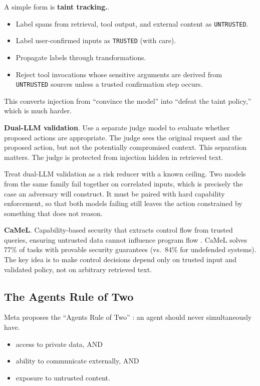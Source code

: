A simple form is \textbf{taint tracking.}.
\begin{itemize}
\item Label spans from retrieval, tool output, and external content as \texttt{UNTRUSTED}.
\item Label user-confirmed inputs as \texttt{TRUSTED} (with care).
\item Propagate labels through transformations.
\item Reject tool invocations whose sensitive arguments are derived from \texttt{UNTRUSTED} sources unless a trusted confirmation step occurs.
\end{itemize}

This converts injection from ``convince the model'' into ``defeat the taint policy,'' which is much harder.

\textbf{Dual-LLM validation}. Use a separate judge model to evaluate whether proposed actions are appropriate. The judge sees the original request and the proposed action, but not the potentially compromised context. This separation matters. The judge is protected from injection hidden in retrieved text.

Treat dual-LLM validation as a risk reducer with a known ceiling. Two models from
the same family fail together on correlated inputs, which is precisely the case an
adversary will construct. It must be paired with hard capability enforcement, so
that both models failing still leaves the action constrained by something that
does not reason.

\textbf{CaMeL}. Capability-based security that extracts control flow from trusted queries, ensuring untrusted data cannot influence program flow \cite{camel2025}. CaMeL solves 77\% of tasks with provable security guarantees (vs.\ 84\% for undefended systems). The key idea is to make control decisions depend only on trusted input and validated policy, not on arbitrary retrieved text.

\subsection{The Agents Rule of Two}

Meta proposes the ``Agents Rule of Two'' \cite{ruleoftwo2025}: an agent should never simultaneously have.
\begin{itemize}
\item access to private data, AND
\item ability to communicate externally, AND
\item exposure to untrusted content.
\end{itemize}

